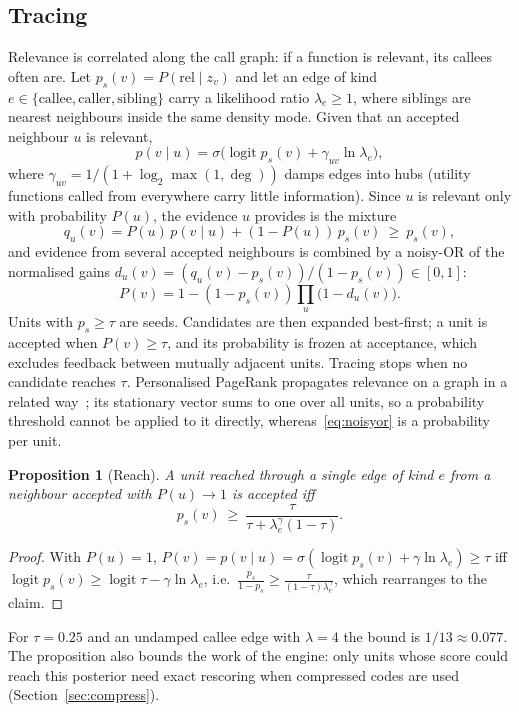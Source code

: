 \documentclass[10pt,twocolumn]{article}
\newtheorem{proposition}[theorem]{Proposition}
\theoremstyle{definition}
\theoremstyle{remark}
\newcommand{\logit}{\operatorname{logit}}
\newcommand{\sigm}{\sigma}
\begin{document}
\subsection{Tracing}
Relevance is correlated along the call graph: if a function is relevant, its callees often are.
Let $p_s(v)=P(\mathrm{rel}\mid z_v)$ and let an edge of kind $e\in\{\text{callee},\text{caller},\text{sibling}\}$ carry a likelihood ratio $\lambda_e\ge1$, where siblings are nearest neighbours inside the same density mode.
Given that an accepted neighbour $u$ is relevant,
\begin{equation}
p(v\mid u)=\sigm\bigl(\logit p_s(v)+\gamma_{uv}\ln\lambda_e\bigr),
\end{equation}
where $\gamma_{uv}=1/(1+\log_2\max(1,\deg))$ damps edges into hubs (utility functions called from everywhere carry little information).
Since $u$ is relevant only with probability $P(u)$, the evidence $u$ provides is the mixture
\begin{equation}
q_u(v)=P(u)\,p(v\mid u)+(1-P(u))\,p_s(v)\ \ge\ p_s(v),
\end{equation}
and evidence from several accepted neighbours is combined by a noisy-OR of the normalised gains $d_u(v)=(q_u(v)-p_s(v))/(1-p_s(v))\in[0,1]$:
\begin{equation}\label{eq:noisyor}
P(v)=1-(1-p_s(v))\prod_{u}\bigl(1-d_u(v)\bigr).
\end{equation}
Units with $p_s\ge\tau$ are seeds.
Candidates are then expanded best-first; a unit is accepted when $P(v)\ge\tau$, and its probability is frozen at acceptance, which excludes feedback between mutually adjacent units.
Tracing stops when no candidate reaches $\tau$.
Personalised PageRank propagates relevance on a graph in a related way~\cite{erkan2004lexrank,gutierrez2024hipporag}; its stationary vector sums to one over all units, so a probability threshold cannot be applied to it directly, whereas~\eqref{eq:noisyor} is a probability per unit.

\begin{proposition}[Reach]\label{prop:reach}
A unit reached through a single edge of kind $e$ from a neighbour accepted with $P(u)\to1$ is accepted iff
\begin{equation}
p_s(v)\ \ge\ \frac{\tau}{\tau+\lambda_e^{\gamma}(1-\tau)} .
\end{equation}
\end{proposition}
\begin{proof}
With $P(u)=1$, $P(v)=p(v\mid u)=\sigm(\logit p_s(v)+\gamma\ln\lambda_e)\ge\tau$ iff $\logit p_s(v)\ge\logit\tau-\gamma\ln\lambda_e$, i.e.\ $\frac{p_s}{1-p_s}\ge\frac{\tau}{(1-\tau)\lambda_e^\gamma}$, which rearranges to the claim.
\end{proof}
For $\tau=0.25$ and an undamped callee edge with $\lambda=4$ the bound is $1/13\approx0.077$.
The proposition also bounds the work of the engine: only units whose score could reach this posterior need exact rescoring when compressed codes are used (Section~\ref{sec:compress}).
\end{document}
